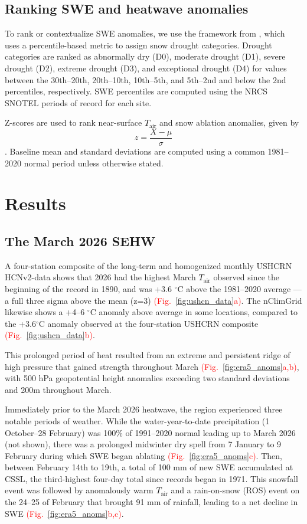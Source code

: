 \documentclass[draft]{agujournal2019}
\newcommand{\fig}[2]{\textcolor{red}{(Fig.~\ref{#1}{#2})}}   %
\newcommand{\tair}{\textcolor{black}{$T_{\mathrm{air}}$}\xspace}
\begin{document}
\subsection{Ranking SWE and heatwave anomalies}\label{sec:snow_drought}
To rank or contextualize SWE anomalies, we use the framework from , which uses a percentile-based metric to assign snow drought categories.
Drought categories are ranked as abnormally dry (D0), moderate drought (D1), severe drought (D2), extreme drought (D3), and exceptional drought (D4) for values between the 30th--20th, 20th--10th, 10th--5th, and 5th--2nd and below the 2nd percentiles, respectively.
SWE percentiles are computed using the NRCS SNOTEL periods of record for each site.

Z-scores are used to rank near-surface \tair and snow ablation anomalies, given by $$z=\frac{X-\mu}{\sigma}$$.
Baseline mean and standard deviations are computed using a common 1981--2020 normal period unless otherwise stated.


\section{Results}

\subsection{The March 2026 SEHW}
A four-station composite of the long-term and homogenized monthly USHCRN HCNv2-data shows that 2026 had the highest March \tair observed since the beginning of the record in 1890, and was +3.6 $^\circ$C above the 1981--2020 average --- a full three sigma above the mean (z=3) \fig{fig:ushcn_data}{a}.
The nClimGrid likewise shows a +4--6 $^\circ$C anomaly above average in some locations, compared to the +3.6$^\circ$C anomaly observed at the four-station USHCRN composite \fig{fig:ushcn_data}{b}.

This prolonged period of heat resulted from an extreme and persistent ridge of high pressure that gained strength throughout March \fig{fig:era5_anoms}{a,b}, with 500 hPa geopotential height anomalies exceeding two standard deviations and 200m throughout March.

Immediately prior to the March 2026 heatwave, the region experienced three notable periods of weather.
While the water-year-to-date precipitation (1 October--28 February) was 100\% of 1991--2020 normal leading up to March 2026 (not shown), there was a prolonged midwinter dry spell \cite{Hatchett2023} from 7 January to 9 February during which SWE began ablating \fig{fig:era5_anoms}{c}.
Then, between February 14th to 19th, a total of 100 mm of new SWE accumulated at CSSL, the third-highest four-day total since records began in 1971.
This snowfall event was followed by anomalously warm \tair and a rain-on-snow (ROS) event on the 24--25 of February that brought 91 mm of rainfall, leading to a net decline in SWE \fig{fig:era5_anoms}{b,c}.
\end{document}
